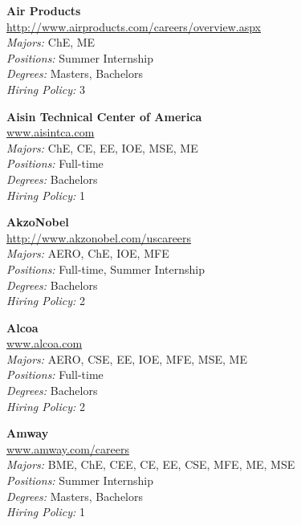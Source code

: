 \documentclass[twoside]{article}
\begin{document}
\begin{center}
\begin{multicols}{3}
\begin{minipage}{.9\columnwidth}{\Large\bf Air Products }\\
	\url{http://www.airproducts.com/careers/overview.aspx}\\
	\emph{Majors:} ChE, ME\\
	\emph{Positions:} Summer Internship\\
	\emph{Degrees:} Masters, Bachelors\\
	\emph{Hiring Policy:} 3\\
\end{minipage}
 
\begin{minipage}{.9\columnwidth}{\Large\bf Aisin Technical Center of America }\\
	\url{www.aisintca.com}\\
	\emph{Majors:} ChE, CE, EE, IOE, MSE, ME\\
	\emph{Positions:} Full-time\\
	\emph{Degrees:} Bachelors\\
	\emph{Hiring Policy:} 1\\
\end{minipage}
 
\begin{minipage}{.9\columnwidth}{\Large\bf AkzoNobel }\\
	\url{http://www.akzonobel.com/uscareers}\\
	\emph{Majors:} AERO, ChE, IOE, MFE\\
	\emph{Positions:} Full-time, Summer Internship\\
	\emph{Degrees:} Bachelors\\
	\emph{Hiring Policy:} 2\\
\end{minipage}
 
\begin{minipage}{.9\columnwidth}{\Large\bf Alcoa }\\
	\url{www.alcoa.com}\\
	\emph{Majors:} AERO, CSE, EE, IOE, MFE, MSE, ME\\
	\emph{Positions:} Full-time\\
	\emph{Degrees:} Bachelors\\
	\emph{Hiring Policy:} 2\\
\end{minipage}
 
\begin{minipage}{.9\columnwidth}{\Large\bf Amway }\\
	\url{www.amway.com/careers}\\
	\emph{Majors:} BME, ChE, CEE, CE, EE, CSE, MFE, ME, MSE\\
	\emph{Positions:} Summer Internship\\
	\emph{Degrees:} Masters, Bachelors\\
	\emph{Hiring Policy:} 1\\
\end{minipage}
 

\end{multicols}
\end{center}
\end{document}
